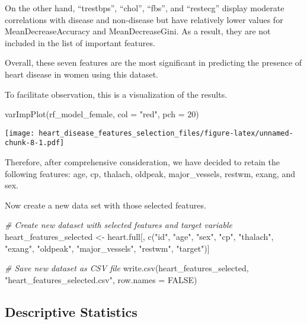 \documentclass[
]{article}
\newenvironment{Shaded}{\begin{snugshade}}{\end{snugshade}}
\newcommand{\AttributeTok}[1]{\textcolor[rgb]{0.77,0.63,0.00}{#1}}
\newcommand{\CommentTok}[1]{\textcolor[rgb]{0.56,0.35,0.01}{\textit{#1}}}
\newcommand{\ConstantTok}[1]{\textcolor[rgb]{0.00,0.00,0.00}{#1}}
\newcommand{\DecValTok}[1]{\textcolor[rgb]{0.00,0.00,0.81}{#1}}
\newcommand{\FunctionTok}[1]{\textcolor[rgb]{0.00,0.00,0.00}{#1}}
\newcommand{\NormalTok}[1]{#1}
\newcommand{\OtherTok}[1]{\textcolor[rgb]{0.56,0.35,0.01}{#1}}
\newcommand{\StringTok}[1]{\textcolor[rgb]{0.31,0.60,0.02}{#1}}
\begin{document}
On the other hand, ``trestbps'', ``chol'', ``fbs'', and ``restecg''
display moderate correlations with disease and non-disease but have
relatively lower values for MeanDecreaseAccuracy and MeanDecreaseGini.
As a result, they are not included in the list of important features.

Overall, these seven features are the most significant in predicting the
presence of heart disease in women using this dataset.

To facilitate observation, this is a visualization of the results.

\begin{Shaded}
\begin{Highlighting}[]
\FunctionTok{varImpPlot}\NormalTok{(rf\_model\_female, }\AttributeTok{col =} \StringTok{"red"}\NormalTok{, }\AttributeTok{pch =} \DecValTok{20}\NormalTok{)}
\end{Highlighting}
\end{Shaded}

\texttt{[image: heart\_disease\_features\_selection\_files/figure-latex/unnamed-chunk-8-1.pdf]}

Therefore, after comprehensive consideration, we have decided to retain
the following features: age, cp, thalach, oldpeak, major\_vessels,
restwm, exang, and sex.

Now create a new data set with those selected features.

\begin{Shaded}
\begin{Highlighting}[]
\CommentTok{\# Create new dataset with selected features and target variable}
\NormalTok{heart\_features\_selected }\OtherTok{\textless{}{-}}\NormalTok{ heart.full[, }\FunctionTok{c}\NormalTok{(}\StringTok{"id"}\NormalTok{, }\StringTok{"age"}\NormalTok{, }\StringTok{"sex"}\NormalTok{, }\StringTok{"cp"}\NormalTok{, }\StringTok{"thalach"}\NormalTok{, }\StringTok{"exang"}\NormalTok{, }\StringTok{"oldpeak"}\NormalTok{, }\StringTok{"major\_vessels"}\NormalTok{, }\StringTok{"restwm"}\NormalTok{, }\StringTok{"target"}\NormalTok{)]}

\CommentTok{\# Save new dataset as CSV file}
\FunctionTok{write.csv}\NormalTok{(heart\_features\_selected, }\StringTok{"heart\_features\_selected.csv"}\NormalTok{, }\AttributeTok{row.names =} \ConstantTok{FALSE}\NormalTok{)}
\end{Highlighting}
\end{Shaded}

\hypertarget{descriptive-statistics}{%
\subsection{Descriptive Statistics}\label{descriptive-statistics}}
\end{document}
